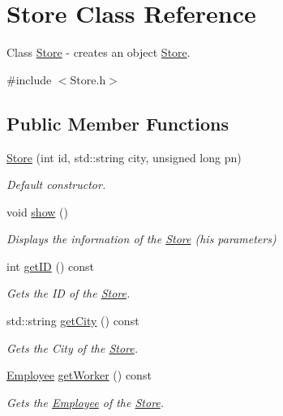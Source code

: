 \hypertarget{class_store}{}\section{Store Class Reference}
\label{class_store}


Class \hyperlink{class_store}{Store} -\/ creates an object \hyperlink{class_store}{Store}.  




{\ttfamily \#include $<$Store.\+h$>$}

\subsection*{Public Member Functions}
\begin{DoxyCompactItemize}
\item 
\hyperlink{class_store_a7e67d8e31c81dd0ae4a8fa5a397a40df}{Store} (int id, std\+::string city, unsigned long pn)
\begin{DoxyCompactList}\small\item\em Default constructor. \end{DoxyCompactList}\item 
void \hyperlink{class_store_a7c3951daba9c6f0c3c432aea46cfd5b8}{show} ()
\begin{DoxyCompactList}\small\item\em Displays the information of the \hyperlink{class_store}{Store} (his parameters) \end{DoxyCompactList}\item 
int \hyperlink{class_store_aaaf0609bbd37babf36a4b9afb09709cf}{get\+ID} () const
\begin{DoxyCompactList}\small\item\em Gets the ID of the \hyperlink{class_store}{Store}. \end{DoxyCompactList}\item 
std\+::string \hyperlink{class_store_a63032ec1afe4b301f55584a8018f478c}{get\+City} () const
\begin{DoxyCompactList}\small\item\em Gets the City of the \hyperlink{class_store}{Store}. \end{DoxyCompactList}\item 
\hyperlink{class_employee}{Employee} \hyperlink{class_store_ab4b4d6e958e7d26398f3e6e0e932c920}{get\+Worker} () const
\begin{DoxyCompactList}\small\item\em Gets the \hyperlink{class_employee}{Employee} of the \hyperlink{class_store}{Store}. \end{DoxyCompactList}\item 

\end{DoxyCompactItemize}
